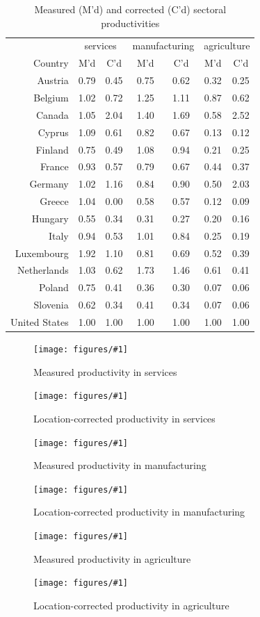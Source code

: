 \documentclass[12pt]{article}
\newcommand{\dofigure}[3]{\begin{figure}
\begin{centering}
\texttt{[image: figures/\#1]}
  \caption{#2\label{fig:#1}}
\end{centering}

\noindent \footnotesize{#3}
\end{figure}}
\begin{document}
\begin{table}[htbp]
  \centering
  \caption{Measured (M'd) and corrected (C'd) sectoral productivities}
    \begin{tabular}{rcccccc}
    \toprule
          & \multicolumn{2}{c}{services} & \multicolumn{2}{c}{manufacturing} & \multicolumn{2}{c}{agriculture}\\
    Country & M'd   & C'd   & M'd   & C'd   & M'd   & C'd \\
    \midrule
    Austria & 0.79  & 0.45  & 0.75  & 0.62  & 0.32  & 0.25 \\
    Belgium & 1.02  & 0.72  & 1.25  & 1.11  & 0.87  & 0.62 \\
    Canada & 1.05  & 2.04  & 1.40  & 1.69  & 0.58  & 2.52 \\
    Cyprus & 1.09  & 0.61  & 0.82  & 0.67  & 0.13  & 0.12 \\
    Finland & 0.75  & 0.49  & 1.08  & 0.94  & 0.21  & 0.25 \\
    France & 0.93  & 0.57  & 0.79  & 0.67  & 0.44  & 0.37 \\
    Germany & 1.02  & 1.16  & 0.84  & 0.90  & 0.50  & 2.03 \\
    Greece & 1.04  & 0.00  & 0.58  & 0.57  & 0.12  & 0.09 \\
    Hungary & 0.55  & 0.34  & 0.31  & 0.27  & 0.20  & 0.16 \\
    Italy & 0.94  & 0.53  & 1.01  & 0.84  & 0.25  & 0.19 \\
    Luxembourg & 1.92  & 1.10  & 0.81  & 0.69  & 0.52  & 0.39 \\
    Netherlands & 1.03  & 0.62  & 1.73  & 1.46  & 0.61  & 0.41 \\
    Poland & 0.75  & 0.41  & 0.36  & 0.30  & 0.07  & 0.06 \\
    Slovenia & 0.62  & 0.34  & 0.41  & 0.34  & 0.07  & 0.06 \\
    United States & 1.00  & 1.00  & 1.00  & 1.00  & 1.00  & 1.00 \\
    \bottomrule
    \end{tabular}%
  \label{tab:prods}%
\end{table}%

\dofigure{measured_prod_1}{Measured productivity in services}{}
\dofigure{true_prod_1}{Location-corrected productivity in services}{}


\dofigure{measured_prod_2}{Measured productivity in manufacturing}{}
\dofigure{true_prod_2}{Location-corrected productivity in manufacturing}{}


\dofigure{measured_prod_3}{Measured productivity in agriculture}{}
\dofigure{true_prod_3}{Location-corrected productivity in agriculture}{}
\end{document}

